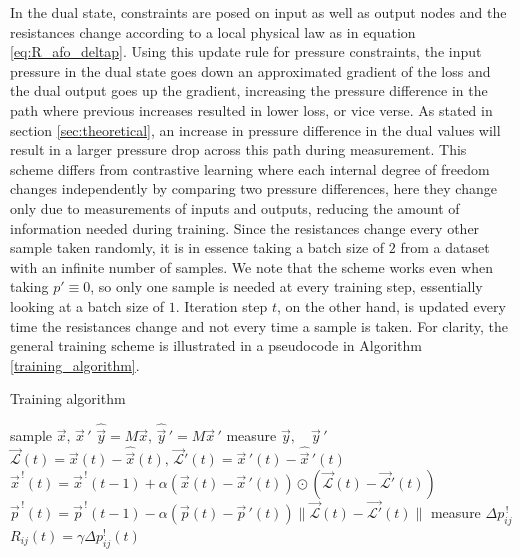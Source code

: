 \documentclass[%
 reprint,
 amsmath,amssymb,
 aps,
]{revtex4-2}
\begin{document}
    In the dual state, constraints are posed on input as well as output nodes and the resistances change according to a local physical law as in equation \ref{eq:R_afo_deltap}. Using this update rule for pressure constraints, the input pressure in the dual state goes down an approximated gradient of the loss and the dual output goes up the gradient, increasing the pressure difference in the path where previous increases resulted in lower loss, or vice verse. As stated in section \ref{sec:theoretical}, an increase in pressure difference in the dual values will result in a larger pressure drop across this path during measurement.
    This scheme differs from contrastive learning \cite{stern2021supervised} where each internal degree of freedom changes independently by comparing two pressure differences, here they change only due to measurements of inputs and outputs, reducing the amount of information needed during training.
    Since the resistances change every other sample taken randomly, it is in essence taking a batch size of $2$ from a dataset with an infinite number of samples. We note that the scheme works even when taking $p'\equiv0$, so only one sample is needed at every training step, essentially looking at a batch size of $1$. Iteration step $t$, on the other hand, is updated every time the resistances change and not every time a sample is taken. For clarity, the general training scheme is illustrated in a pseudocode in Algorithm \ref{training_algorithm}. 

\begin{algorithm}
\caption{Training algorithm}\label{training_algorithm}
\begin{algorithmic}
    \State sample $\vec{x},\,\vec{x}\,'$ \hfill {}
    \State $\hat{\vec{y}}=M\vec{x},\,\hat{\vec{y}}\,'=M\vec{x}\,'$ \hfill {}
    \State measure $\vec{y}, \quad \vec{y}\,'$ \hfill {}
    \State $\vec{\mathcal{L}}\left(t\right)=\vec{x}\left(t\right)-\hat{\vec{x}}\left(t\right),\,\vec{\mathcal{L}}'\left(t\right)=\vec{x}\,'\left(t\right)-\hat{\vec{x}}\,'\left(t\right)$ \hfill {}
    \State $\vec{x}^{\,!}\left(t\right)=\vec{x}^{\,!}\left(t-1\right)+\alpha\left(\vec{x}\left(t\right)-\vec{x}\,'\left(t\right)\right)\odot\left(\vec{\mathcal{L}}\left(t\right)-\vec{\mathcal{L}}'\left(t\right)\right)$
    \State $\vec{p}^{\,!}\left(t\right)=\vec{p}^{\,!}\left(t-1\right)-\alpha\left(\vec{p}\left(t\right)-\vec{p}\,'\left(t\right)\right)\|\vec{\mathcal{L}}\left(t\right)-\vec{\mathcal{L}'}\left(t\right)\|$
    \State \hfill {}
    \State measure $\Delta p^{\,!}_{ij}$ \hfill {}
    \State $R_{ij}\left(t\right)=\gamma \Delta p^!_{ij}\left(t\right)$ \hfill {}
\EndFor
\end{algorithmic}
\end{algorithm}
\end{document}

